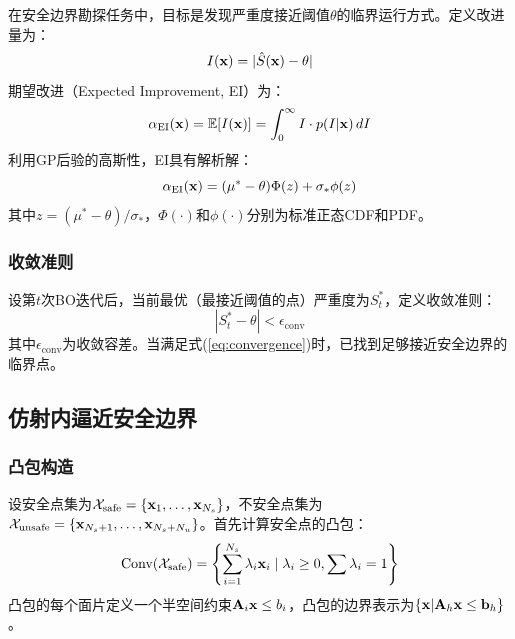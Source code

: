 在安全边界勘探任务中，目标是发现严重度接近阈值$\theta$的临界运行方式。定义改进量为：
\begin{equation}
    I(\mathbf{x}) = |\hat{S}(\mathbf{x}) - \theta|
    \label{eq:improvement}
\end{equation}
期望改进（Expected Improvement, EI）为：
\begin{equation}
    \alpha_{\text{EI}}(\mathbf{x}) = \mathbb{E}[I(\mathbf{x})] = \int_0^\infty I \cdot p(I | \mathbf{x}) \, dI
    \label{eq:ei}
\end{equation}
利用GP后验的高斯性，EI具有解析解：
\begin{equation}
    \alpha_{\text{EI}}(\mathbf{x}) = (\mu^* - \theta)\Phi(z) + \sigma_* \phi(z)
    \label{eq:ei_analytic}
\end{equation}
其中$z = (\mu^* - \theta)/\sigma_*$，$\Phi(\cdot)$和$\phi(\cdot)$分别为标准正态CDF和PDF。

\subsubsection{收敛准则}

设第$t$次BO迭代后，当前最优（最接近阈值的点）严重度为$S_t^*$，定义收敛准则：
\begin{equation}
    |S_t^* - \theta| < \epsilon_{\text{conv}}
    \label{eq:convergence}
\end{equation}
其中$\epsilon_{\text{conv}}$为收敛容差。当满足式(\ref{eq:convergence})时，已找到足够接近安全边界的临界点。

\subsection{仿射内逼近安全边界}
\label{subsec:aia}

\subsubsection{凸包构造}

设安全点集为$\mathcal{X}_{\text{safe}} = \{\mathbf{x}_1, \ldots, \mathbf{x}_{N_s}\}$，不安全点集为$\mathcal{X}_{\text{unsafe}} = \{\mathbf{x}_{N_s+1}, \ldots, \mathbf{x}_{N_s+N_u}\}$。首先计算安全点的凸包：
\begin{equation}
    \text{Conv}(\mathcal{X}_{\text{safe}}) = \left\{\sum_{i=1}^{N_s} \lambda_i \mathbf{x}_i \mid \lambda_i \geq 0, \sum \lambda_i = 1\right\}
    \label{eq:convex_hull}
\end{equation}
凸包的每个面片定义一个半空间约束$\mathbf{A}_i \mathbf{x} \leq b_i$，凸包的边界表示为$\{\mathbf{x} | \mathbf{A}_h \mathbf{x} \leq \mathbf{b}_h\}$。

